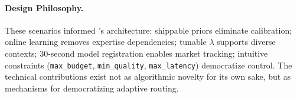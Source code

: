 \paragraph{Design Philosophy.} These scenarios informed \ours{}'s architecture: shippable priors eliminate calibration; online learning removes expertise dependencies; tunable $\lambda$ supports diverse contexts; 30-second model registration enables market tracking; intuitive constraints (\texttt{max\_budget}, \texttt{min\_quality}, \texttt{max\_latency}) democratize control. The technical contributions exist not as algorithmic novelty for its own sake, but as mechanisms for democratizing adaptive routing.


